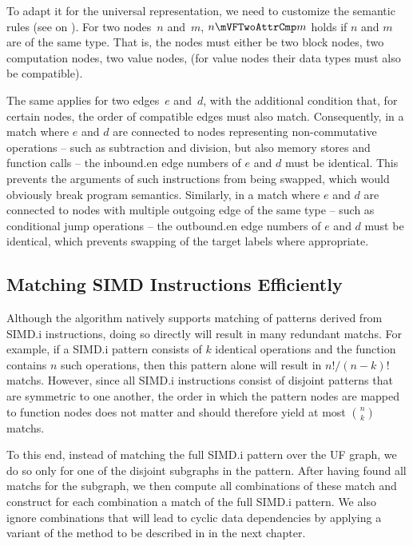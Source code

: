 To adapt it for the \gls{universal representation}, we need to customize the
semantic rules (see  on
).
%
For two \glspl{node}~$n$ and~$m$, \mbox{$n \mVFTwoAttrCmp m$} holds if $n$ and
$m$ are of the same type.
%
That is, the \glspl{node} must either be two \glspl{block node}, two
\glspl{computation node}, two \glspl{value node}, \etc (for \glspl{value node}
their data types must also be compatible).

The same applies for two \glspl{edge}~$e$ and~$d$, with the additional condition
that, for certain \glspl{node}, the order of compatible \glspl{edge} must also
match.
%
Consequently, in a \gls{match} where $e$ and $d$ are connected to \glspl{node}
representing non-commutative \glspl{operation} -- such as subtraction and
division, but also memory stores and function calls -- the \gls{inbound.en}
\glspl{edge number} of $e$ and $d$ must be identical.
%
This prevents the arguments of such \glspl{instruction} from being swapped,
which would obviously break \gls{program} semantics.
%
Similarly, in a \gls{match} where $e$ and $d$ are connected to \glspl{node} with
multiple outgoing \gls{edge} of the same type -- such as conditional jump
\glspl{operation} -- the \gls{outbound.en} \glspl{edge number} of $e$ and $d$
must be identical, which prevents swapping of the target labels where
appropriate.


\subsection{Matching SIMD Instructions Efficiently}

Although the algorithm natively supports matching of \glspl{pattern} derived
from \gls{SIMD.i} \glspl{instruction}, doing so directly will result in many
redundant \glspl{match}.
%
For example, if a \gls{SIMD.i} \gls{pattern} consists of $k$ identical
\glspl{operation} and the function contains $n$ such \glspl{operation}, then
this \gls{pattern} alone will result in \mbox{$n! / (n - k)!$} \glspl{match}.
%
However, since all \gls{SIMD.i} \glspl{instruction} consist of disjoint
\glspl{pattern} that are symmetric to one another, the order in which the
\gls{pattern} \glspl{node} are mapped to \gls{function} \glspl{node} does not
matter and should therefore yield at most $\binom{n}{k}$ \glspl{match}.

To this end, instead of matching the full \gls{SIMD.i} \gls{pattern} over the
\gls{UF graph}, we do so only for one of the disjoint \glspl{subgraph} in the
\gls{pattern}.
%
After having found all \glspl{match} for the \gls{subgraph}, we then compute all
combinations of these \gls{match} and construct for each combination a
\gls{match} of the full \gls{SIMD.i} \gls{pattern}.
%
We also ignore combinations that will lead to cyclic data dependencies by
applying a variant of the method to be described in
 in the next chapter.

